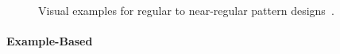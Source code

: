 \begin{figure}[H]
    \centering
    \caption{\label{fig:textures}Visual examples for regular to near-regular pattern designs~\cite{gieseke_2014_ipr}.}
\end{figure}

\paragraph*{Example-Based}
\label{para:analysis_regular_example}

